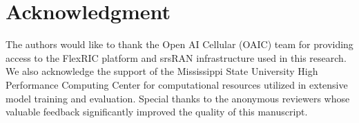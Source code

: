 \documentclass[journal]{IEEEtran}
\begin{document}
\section*{Acknowledgment}

The authors would like to thank the Open AI Cellular (OAIC) team for providing access to the FlexRIC platform and srsRAN infrastructure used in this research. We also acknowledge the support of the Mississippi State University High Performance Computing Center for computational resources utilized in extensive model training and evaluation. Special thanks to the anonymous reviewers whose valuable feedback significantly improved the quality of this manuscript.



\end{document}
